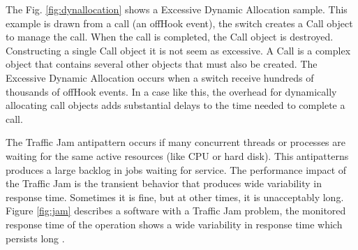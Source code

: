 The Fig. \ref{fig:dynallocation} shows a Excessive Dynamic Allocation sample. This example is drawn from a call (an offHook event), the switch creates a Call object to manage the call. When the call is completed, the Call object is destroyed. Constructing a single Call object it is not seem as excessive. A Call is a complex object that contains several other objects that must also be created. The Excessive Dynamic Allocation occurs when  a switch receive hundreds of thousands of offHook events. In a case like this, the overhead for dynamically allocating call objects adds substantial delays to the time needed to complete a call.

The Traffic Jam antipattern occurs if many concurrent threads or processes are waiting for the same  active resources (like CPU or hard disk). This antipatterns produces a large backlog in jobs waiting for service. The performance impact of the Traffic Jam is the transient behavior that produces wide variability in response time. Sometimes it is fine, but at other times, it is unacceptably long. Figure \ref{fig:jam} describes a software with a Traffic Jam problem, the monitored response time of the operation shows a wide variability in response time which persists long \cite{Vetoio2011}. 


